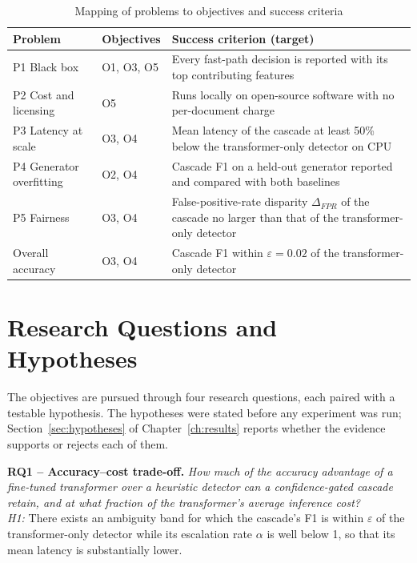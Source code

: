 \begin{table}[H]
\caption{Mapping of problems to objectives and success criteria}
\label{tab:gap-obj}
\centering
\small
\begin{tabularx}{\textwidth}{|p{3.2cm}|p{1.6cm}|L|}
\hline
\textbf{Problem} & \textbf{Objectives} & \textbf{Success criterion (target)} \\ \hline
P1 Black box & O1, O3, O5 & Every fast-path decision is reported with its top contributing features \\ \hline
P2 Cost and licensing & O5 & Runs locally on open-source software with no per-document charge \\ \hline
P3 Latency at scale & O3, O4 & Mean latency of the cascade at least 50\% below the transformer-only detector on CPU \\ \hline
P4 Generator overfitting & O2, O4 & Cascade F1 on a held-out generator reported and compared with both baselines \\ \hline
P5 Fairness & O3, O4 & False-positive-rate disparity $\Delta_{FPR}$ of the cascade no larger than that of the transformer-only detector \\ \hline
Overall accuracy & O3, O4 & Cascade F1 within $\varepsilon = 0.02$ of the transformer-only detector \\ \hline
\end{tabularx}
\end{table}

\section{Research Questions and Hypotheses}

The objectives are pursued through four research questions, each paired
with a testable hypothesis. The hypotheses were stated before any experiment
was run; Section~\ref{sec:hypotheses} of Chapter~\ref{ch:results} reports
whether the evidence supports or rejects each of them.

\textbf{RQ1 -- Accuracy--cost trade-off.} \emph{How much of the accuracy
advantage of a fine-tuned transformer over a heuristic detector can a
confidence-gated cascade retain, and at what fraction of the transformer's
average inference cost?}\\
\textit{H1:} There exists an ambiguity band for which the cascade's F1 is
within $\varepsilon$ of the transformer-only detector while its escalation rate
$\alpha$ is well below 1, so that its mean latency is substantially lower.

